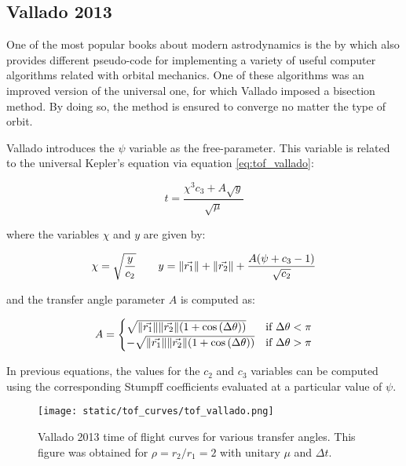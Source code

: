 \subsection{Vallado 2013}

One of the most popular books about modern astrodynamics is the
 by which also provides different pseudo-code for
implementing a variety of useful computer algorithms related with orbital
mechanics. One of these algorithms was an improved version of the
\cite{bate1971} universal one, for which Vallado imposed a bisection method. By
doing so, the method is ensured to converge no matter the type of orbit.

Vallado introduces the $\psi$ variable as the free-parameter. This variable is
related to the universal Kepler's equation via equation \ref{eq:tof_vallado}:

\begin{equation}
  t = \frac{\chi^3 c_3 + A \sqrt{y}}{\sqrt{\mu}}
  \label{eq:tof_vallado}
\end{equation}

where the variables $\chi$ and $y$ are given by:

\begin{equation}
  \chi = \sqrt{\frac{y}{c_2}}\quad\quad
  y = \lVert\vec{r_1}\rVert + \lVert\vec{r_2}\rVert + \frac{A(\psi + c_3 - 1)}{\sqrt{c_2}}
\end{equation}

and the transfer angle parameter $A$ is computed as:

\begin{equation}
  A = 
  \begin{cases}
    \sqrt{\lVert\vec{r_1}\rVert \lVert\vec{r_2}\rVert (1 + \cos{(\Delta \theta)})} & \text{if $\Delta \theta < \pi$}\\
    -\sqrt{\lVert\vec{r_1}\rVert \lVert\vec{r_2}\rVert (1 + \cos{(\Delta \theta)})} & \text{if $\Delta \theta > \pi$}\\
  \end{cases}
\end{equation}

In previous equations, the values for the $c_2$ and $c_3$ variables can be
computed using the corresponding Stumpff coefficients evaluated at a particular
value of $\psi$.

\vspace{0.5cm}
\begin{figure}[h]
  \centering
  \texttt{[image: static/tof\_curves/tof\_vallado.png]}
  \caption{Vallado 2013 time of flight curves for various transfer angles. This
  figure was obtained for $\rho=r_2/r_1=2$ with unitary $\mu$ and $\Delta t$.}
  \label{fig:tof_vallado}
\end{figure}

